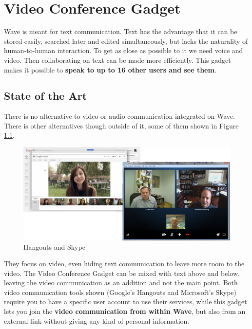 \thispagestyle{sectioned}
\chapter{Video Conference Gadget}
Wave is meant for text communication. Text has the advantage that it can be stored easily, searched later and edited simultaneously, but lacks the naturality of human-to-human interaction. To get as close as possible to it we need voice and video. Then collaborating on text can be made more efficiently. This gadget makes it possible to \textbf{speak to up to 16 other users and see them}.

\label{subsec:video_soa}
\section{State of the Art}
There is no alternative to video or audio communication integrated on Wave. There is other alternatives though outside of it, some of them shown in Figure \ref{fig:skype_hangouts}.
\begin{figure}[h]
  \center
    \includegraphics[keepaspectratio, scale=0.6]{Media/Captures/Soa/skype_hangouts.png}
  \caption{Hangouts and Skype}
  \label{fig:skype_hangouts}
\end{figure}
They focus on video, even hiding text communication to leave more room to the video. The Video Conference Gadget can be mixed with text above and below, leaving the video communication as an addition and not the main point. Both video communication tools shown (Google's Hangouts and Microsoft's Skype) require you to have a specific user account to use their services, while this gadget lets you join the \textbf{video communication from within Wave}, but also from an external link without giving any kind of personal information.

